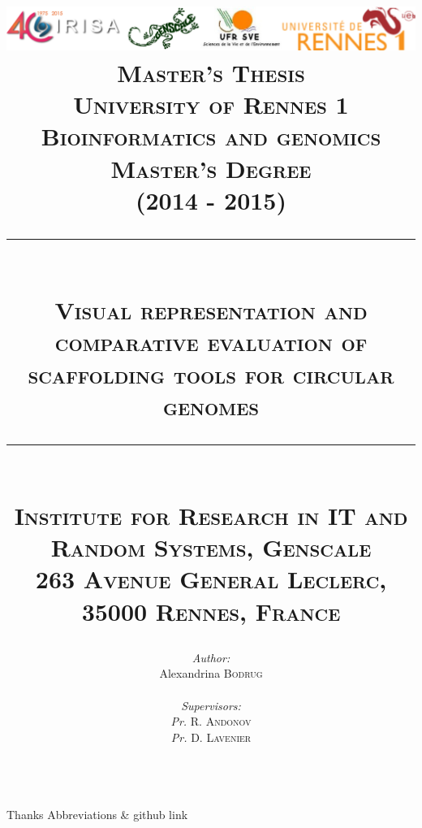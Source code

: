 \documentclass[12pt]{report}
\newcommand{\HRule}[1]{\rule{\linewidth}{#1}}
\begin{document}
\begin{titlepage}

\title{ \includegraphics[width=\textwidth, height=\textheight, keepaspectratio]{logos.jpg} \vspace*{1\baselineskip} \\
        \large \textbf{\textsc{Master's Thesis}} \\
        \normalsize \textsc{University of Rennes 1} \\
        \normalsize \textsc{Bioinformatics and genomics Master's Degree} \\
        \normalsize \textsc{(2014 - 2015)}
		\\
		\HRule{0.5pt} \\
		\large \textbf{\textsc{Visual representation and comparative evaluation of scaffolding tools for circular genomes}}
		\HRule{2pt} \\ [0.5cm]
		\footnotesize \textsc{Institute for Research in IT and Random Systems, Genscale \\
		263 Avenue General Leclerc, 35000 Rennes, France}
        }
\author{ \normalsize
	\begin{minipage}{0.4\textwidth}
	\begin{flushleft} 
	\emph{Author:}\\
	Alexandrina \textsc{Bodrug}
	\end{flushleft}
	\end{minipage}
	~
	\begin{minipage}{0.4\textwidth}
	\begin{flushright}
	\emph{Supervisors:} \\
	\textit{Pr.} R. \textsc{Andonov} \\
	\textit{Pr.} D. \textsc{Lavenier}
	\end{flushright}
	\end{minipage}\\[2cm]
	}
\end{titlepage}
\maketitle
\newpage
Thanks
\thispagestyle{empty}
\newpage
Abbreviations \& github link
\thispagestyle{empty}
\newpage
\tableofcontents
\thispagestyle{empty}
\end{document}
